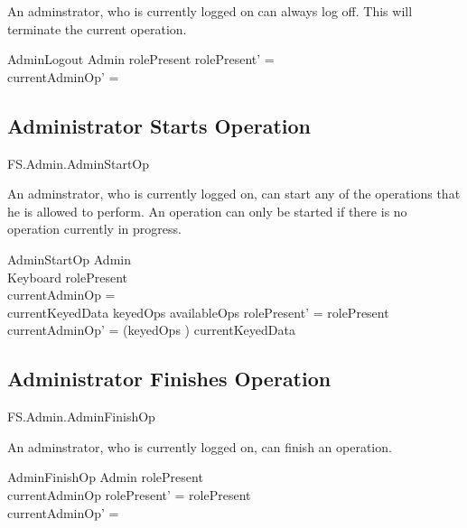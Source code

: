 An adminstrator, who is currently logged on can always log off.
This will terminate the current operation.

\begin{schema}{AdminLogout}
        \Delta Admin
\where
        rolePresent \neq \Nil
\also
        rolePresent' = \Nil
\\      currentAdminOp' = \Nil
\end{schema}

\subsection{Administrator Starts Operation}

\begin{traceunit}{FS.Admin.AdminStartOp}
\end{traceunit}

An adminstrator, who is currently logged on, can start any of the
operations that he is allowed to perform. An operation can only be
started if there is no operation currently in progress.

\begin{schema}{AdminStartOp}
        \Delta Admin
\\      Keyboard
\where
        rolePresent \neq \Nil
\\      currentAdminOp = \Nil
\\      currentKeyedData \in keyedOps \limg availableOps \rimg
\also
        rolePresent' = rolePresent
\\      \The currentAdminOp' = (keyedOps \inv) currentKeyedData
\end{schema}

\subsection{Administrator Finishes Operation}

\begin{traceunit}{FS.Admin.AdminFinishOp}
\end{traceunit}

An adminstrator, who is currently logged on, can finish an operation.

\begin{schema}{AdminFinishOp}
        \Delta Admin
\where
        rolePresent \neq \Nil
\\      currentAdminOp \neq \Nil
\also
        rolePresent' = rolePresent
\\      currentAdminOp' = \Nil 
\end{schema}




